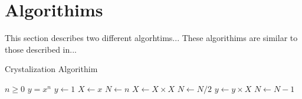 \section{Algorithims}
\label{sec:Algorithims}

This section describes two different algorhtims... These algorithims are similar to those described in...

\begin{algorithm}[htbp]
\hrulefill
\caption{Crystalization Algorithim}
\label{alg1}
\hrulefill
\begin{algorithmic}
\REQUIRE $n \geq 0$
\ENSURE $y = x^n$ 
\STATE $y \leftarrow 1$
\STATE $X \leftarrow x$
\STATE $N \leftarrow n$
\STATE $X \leftarrow X \times X$
\STATE $N \leftarrow N / 2$
\ELSE[$N$ is odd]
 \STATE $y \leftarrow y \times X$
\STATE $N \leftarrow N - 1$
\ENDIF
\ENDWHILE
\end{algorithmic}
\hrulefill
\end{algorithm}